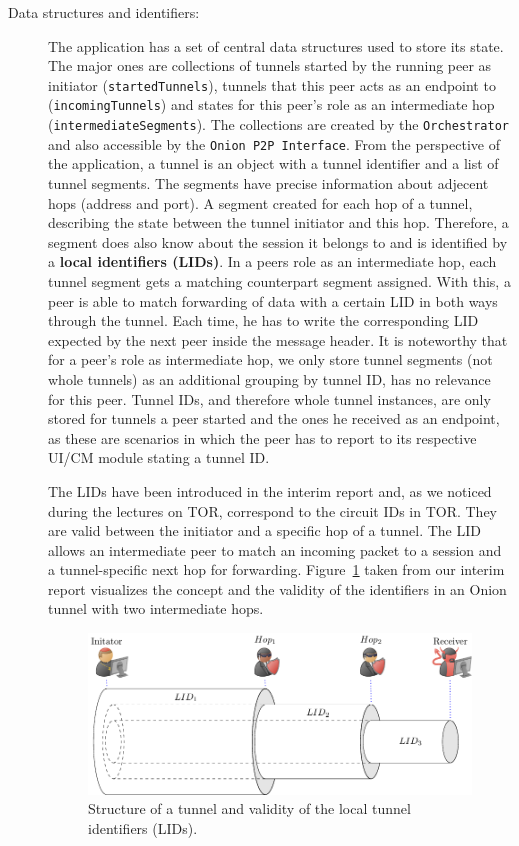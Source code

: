 \documentclass[paper=letter, fontsize=12pt]{article}
\begin{document}
\begin{description}
    \item [Data structures and identifiers:] The application has a set of central data structures used to store its state. The major ones are collections of tunnels started by the running peer as initiator (\texttt{startedTunnels}), tunnels that this peer acts as an endpoint to (\texttt{incomingTunnels}) and states for this peer's role as an intermediate hop (\texttt{intermediateSegments}). The collections are created by the \texttt{Orchestrator} and also accessible by the \texttt{Onion P2P Interface}. 
    From the perspective of the application, a tunnel is an object with a tunnel identifier and a list of tunnel segments. The segments have precise information about adjecent hops (address and port). A segment created for each hop of a tunnel, describing the state between the tunnel initiator and this hop. Therefore, a segment does also know about the session it belongs to and is identified by a \textbf{local identifiers (LIDs)}. In a peers role as an intermediate hop, each tunnel segment gets a matching counterpart segment assigned. With this, a peer is able to match forwarding of data with a certain LID in both ways through the tunnel. Each time, he has to write the corresponding LID expected by the next peer inside the message header. It is noteworthy that for a peer's role as intermediate hop, we only store tunnel segments (not whole tunnels) as an additional grouping by tunnel ID, has no relevance for this peer. Tunnel IDs, and therefore whole tunnel instances, are only stored for tunnels a peer started and the ones he received as an endpoint, as these are scenarios in which the peer has to report to its respective UI/CM module stating a tunnel ID. 

    The LIDs have been introduced in the interim report and, as we noticed during the lectures on TOR, correspond to the circuit IDs in TOR. They are valid between the initiator and a specific hop of a tunnel. The LID allows an intermediate peer to match an incoming packet to a session and a tunnel-specific next hop for forwarding. Figure~\ref{fig:lids} taken from our interim report visualizes the concept and the validity of the identifiers in an Onion tunnel with two intermediate hops.

    \begin{figure}[ht]
    \centering
    \includegraphics[width=.94\textwidth,right]{images/lids.pdf}
    \caption{Structure of a tunnel and validity of the local tunnel identifiers (LIDs).}
    \label{fig:lids}
    \end{figure}
\end{description}
\end{document}
